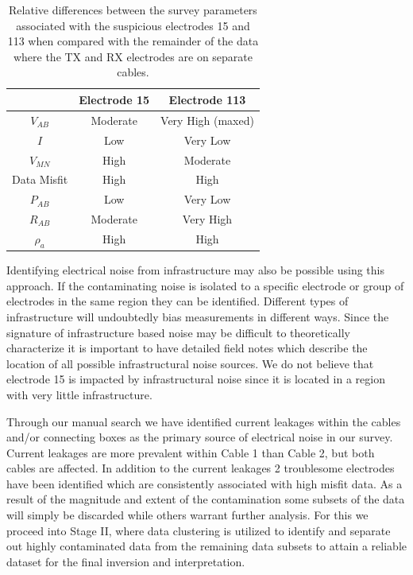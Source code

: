 \documentclass[final,authoryear,5p,times,twocolumn]{elsarticle}
\begin{document}
\begin{table}[!ht]
\begin{center}
  \begin{tabular}{| c | c | c |}
    \hline
     & Electrode 15 &  Electrode 113 \\ \hline
    $V_{AB}$ & Moderate & Very High (maxed) \\
    $I$ & Low & Very Low \\
    $V_{MN}$ & High & Moderate \\
    Data Misfit & High & High \\
    $P_{AB}$ &  Low & Very Low \\
    $R_{AB}$ & Moderate & Very High \\
    $\rho_{a}$ & High & High \\
    \hline
  \end{tabular}
\caption{Relative differences between the survey parameters associated with the suspicious electrodes 15 and 113 when compared with the remainder of the data where the TX and RX electrodes are on separate cables.}
\label{tab:BadElec_Props}
\end{center}
\end{table}

Identifying electrical noise from infrastructure may also be possible using this approach. If the contaminating noise is isolated to a specific electrode or group of electrodes in the same region they can be identified. Different types of infrastructure will undoubtedly bias measurements in different ways. Since the signature of infrastructure based noise may be difficult to theoretically characterize it is important to have detailed field notes which describe the location of all possible infrastructural noise sources. We do not believe that electrode 15 is impacted by infrastructural noise since it is located in a region with very little infrastructure.

Through our manual search we have identified current leakages within the cables and/or connecting boxes as the primary source of electrical noise in our survey. Current leakages are more prevalent within Cable 1 than Cable 2, but both cables are affected. In addition to the current leakages 2 troublesome electrodes have been identified which are consistently associated with high misfit data. As a result of the magnitude and extent of the contamination some subsets of the data will simply be discarded while others warrant further analysis. For this we proceed into Stage II, where data clustering is utilized to identify and separate out highly contaminated data from the remaining data subsets to attain a reliable dataset for the final inversion and interpretation.
\end{document}
